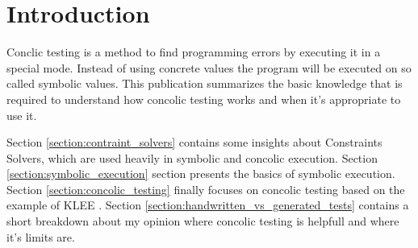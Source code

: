 \section{Introduction}
Conclic testing is a method to find programming errors by executing it in a special mode.
Instead of using concrete values the program will be executed on so called symbolic values.
This publication summarizes the basic knowledge that is required to understand how concolic testing works and when it's appropriate to use it.

Section \ref{section:contraint_solvers} contains some insights about Constraints Solvers, which are used heavily in symbolic and concolic execution.
Section \ref{section:symbolic_execution} section presents the basics of symbolic execution. 
Section \ref{section:concolic_testing} finally focuses on concolic testing based on the example of KLEE \cite{Cadar:2008:KUA:1855741.1855756}. 
Section \ref{section:handwritten_vs_generated_tests} contains a short breakdown about my opinion where concolic testing is helpfull and where it's limits are.
